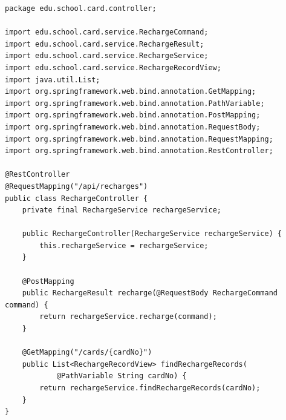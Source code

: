 \documentclass[UTF8,zihao=-4]{ctexart}
\begin{document}
\small
\begin{verbatim}
package edu.school.card.controller;

import edu.school.card.service.RechargeCommand;
import edu.school.card.service.RechargeResult;
import edu.school.card.service.RechargeService;
import edu.school.card.service.RechargeRecordView;
import java.util.List;
import org.springframework.web.bind.annotation.GetMapping;
import org.springframework.web.bind.annotation.PathVariable;
import org.springframework.web.bind.annotation.PostMapping;
import org.springframework.web.bind.annotation.RequestBody;
import org.springframework.web.bind.annotation.RequestMapping;
import org.springframework.web.bind.annotation.RestController;

@RestController
@RequestMapping("/api/recharges")
public class RechargeController {
    private final RechargeService rechargeService;

    public RechargeController(RechargeService rechargeService) {
        this.rechargeService = rechargeService;
    }

    @PostMapping
    public RechargeResult recharge(@RequestBody RechargeCommand command) {
        return rechargeService.recharge(command);
    }

    @GetMapping("/cards/{cardNo}")
    public List<RechargeRecordView> findRechargeRecords(
            @PathVariable String cardNo) {
        return rechargeService.findRechargeRecords(cardNo);
    }
}
\end{verbatim}
\normalsize
\end{document}
